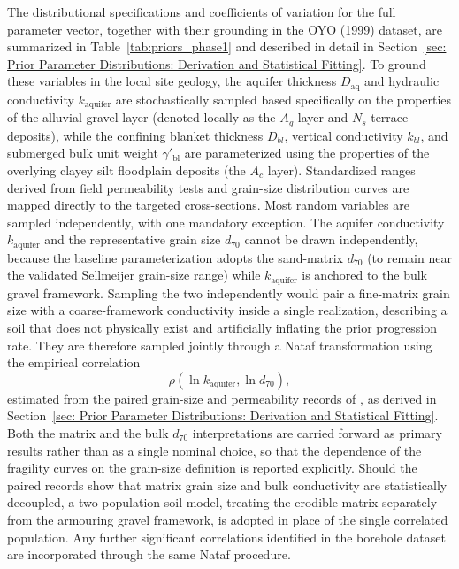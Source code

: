 The distributional specifications and coefficients of variation for the full parameter vector, together with their grounding in the OYO (1999) dataset, are summarized in Table~\ref{tab:priors_phase1} and described in detail in Section~\ref{sec: Prior Parameter Distributions: Derivation and Statistical Fitting}. To ground these variables in the local site geology, the aquifer thickness $D_\mathrm{aq}$ and hydraulic conductivity $k_\mathrm{aquifer}$ are stochastically sampled based specifically on the properties of the alluvial gravel layer (denoted locally as the $A_g$ layer and $N_s$ terrace deposits), while the confining blanket thickness $D_{bl}$, vertical conductivity $k_{bl}$, and submerged bulk unit weight $\gamma'_\mathrm{bl}$ are parameterized using the properties of the overlying clayey silt floodplain deposits (the $A_c$ layer). Standardized ranges derived from field permeability tests and grain-size distribution curves are mapped directly to the targeted cross-sections. Most random variables are sampled independently, with one mandatory exception. The aquifer conductivity $k_\mathrm{aquifer}$ and the representative grain size $d_{70}$ cannot be drawn independently, because the baseline parameterization adopts the sand-matrix $d_{70}$ (to remain near the validated Sellmeijer grain-size range) while $k_\mathrm{aquifer}$ is anchored to the bulk gravel framework. Sampling the two independently would pair a fine-matrix grain size with a coarse-framework conductivity inside a single realization, describing a soil that does not physically exist and artificially inflating the prior progression rate. They are therefore sampled jointly through a Nataf transformation using the empirical correlation \[ \rho\!\left(\ln k_\mathrm{aquifer}, \ln d_{70}\right), \] estimated from the paired grain-size and permeability records of \textcite{oyo_1999}, as derived in Section~\ref{sec: Prior Parameter Distributions: Derivation and Statistical Fitting}.  Both the matrix and the bulk $d_{70}$ interpretations are carried forward as primary results rather than as a single nominal choice, so that the dependence of the fragility curves on the grain-size definition is reported explicitly. Should the paired records show that matrix grain size and bulk conductivity are statistically decoupled, a two-population soil model, treating the erodible matrix separately from the armouring gravel framework, is adopted in place of the single correlated population. Any further significant correlations identified in the borehole dataset are incorporated through the same Nataf procedure.

